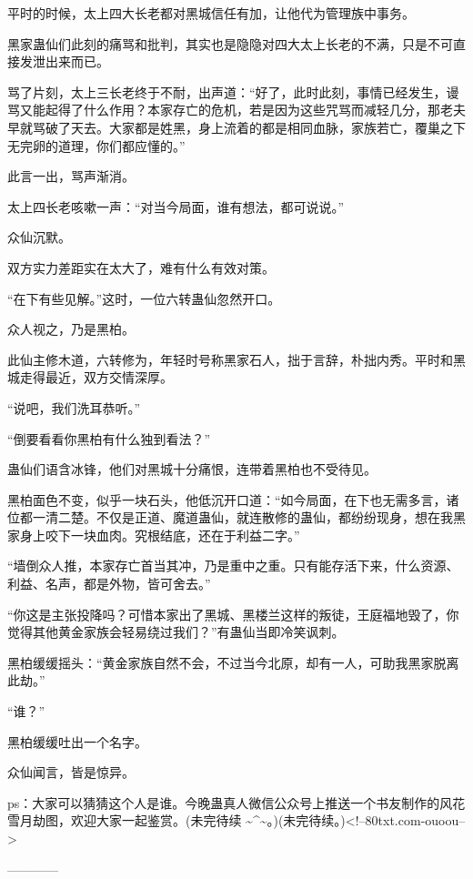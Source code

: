 \begin{this_body}
平时的时候，太上四大长老都对黑城信任有加，让他代为管理族中事务。

黑家蛊仙们此刻的痛骂和批判，其实也是隐隐对四大太上长老的不满，只是不可直接发泄出来而已。

骂了片刻，太上三长老终于不耐，出声道：“好了，此时此刻，事情已经发生，谩骂又能起得了什么作用？本家存亡的危机，若是因为这些咒骂而减轻几分，那老夫早就骂破了天去。大家都是姓黑，身上流着的都是相同血脉，家族若亡，覆巢之下无完卵的道理，你们都应懂的。”

此言一出，骂声渐消。

太上四长老咳嗽一声：“对当今局面，谁有想法，都可说说。”

众仙沉默。

双方实力差距实在太大了，难有什么有效对策。

“在下有些见解。”这时，一位六转蛊仙忽然开口。

众人视之，乃是黑柏。

此仙主修木道，六转修为，年轻时号称黑家石人，拙于言辞，朴拙内秀。平时和黑城走得最近，双方交情深厚。

“说吧，我们洗耳恭听。”

“倒要看看你黑柏有什么独到看法？”

蛊仙们语含冰锋，他们对黑城十分痛恨，连带着黑柏也不受待见。

黑柏面色不变，似乎一块石头，他低沉开口道：“如今局面，在下也无需多言，诸位都一清二楚。不仅是正道、魔道蛊仙，就连散修的蛊仙，都纷纷现身，想在我黑家身上咬下一块血肉。究根结底，还在于利益二字。”

“墙倒众人推，本家存亡首当其冲，乃是重中之重。只有能存活下来，什么资源、利益、名声，都是外物，皆可舍去。”

“你这是主张投降吗？可惜本家出了黑城、黑楼兰这样的叛徒，王庭福地毁了，你觉得其他黄金家族会轻易绕过我们？”有蛊仙当即冷笑讽刺。

黑柏缓缓摇头：“黄金家族自然不会，不过当今北原，却有一人，可助我黑家脱离此劫。”

“谁？”

黑柏缓缓吐出一个名字。

众仙闻言，皆是惊异。

ps：大家可以猜猜这个人是谁。今晚蛊真人微信公众号上推送一个书友制作的风花雪月劫图，欢迎大家一起鉴赏。(未完待续 \~{}\^{}\~{}。)(未完待续。)<!--80txt.com-ouoou-->

------------

\end{this_body}


